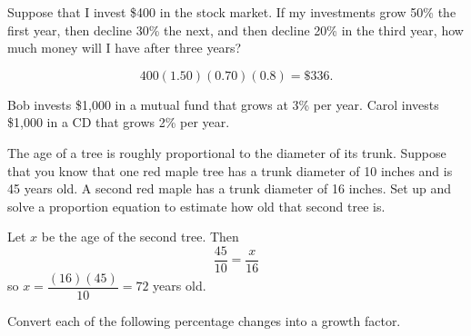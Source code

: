 \documentclass[11pt]{exam}
\begin{document}
\begin{questions}
\question Suppose that I invest \$400 in the stock market. If my investments grow 50\% the first year, then decline 30\% the next, and then decline 20\% in the third year, how much money will I have after three years?
\begin{solution}
$$400(1.50)(0.70)(0.8) = \$336.$$
\end{solution}
\vfill

\question Bob invests \$1,000 in a mutual fund that grows at 3\% per year.  Carol invests \$1,000 in a CD that grows 2\% per year.  
\vfill

\question The age of a tree is roughly proportional to the diameter of its trunk. Suppose that you know that one red maple tree has a trunk diameter of 10 inches and is 45 years old. A second red maple has a trunk diameter of 16 inches. Set up and solve a proportion equation to estimate how old that second tree is.
\begin{solution}
Let $x$ be the age of the second tree. Then
$$\dfrac{45}{10} = \dfrac{x}{16}$$
so $x = \dfrac{(16)(45)}{10} = 72$ years old.  
\end{solution}
\vfill

\newpage
\question Convert each of the following percentage changes into a growth factor. 
\end{questions}
\end{document}
